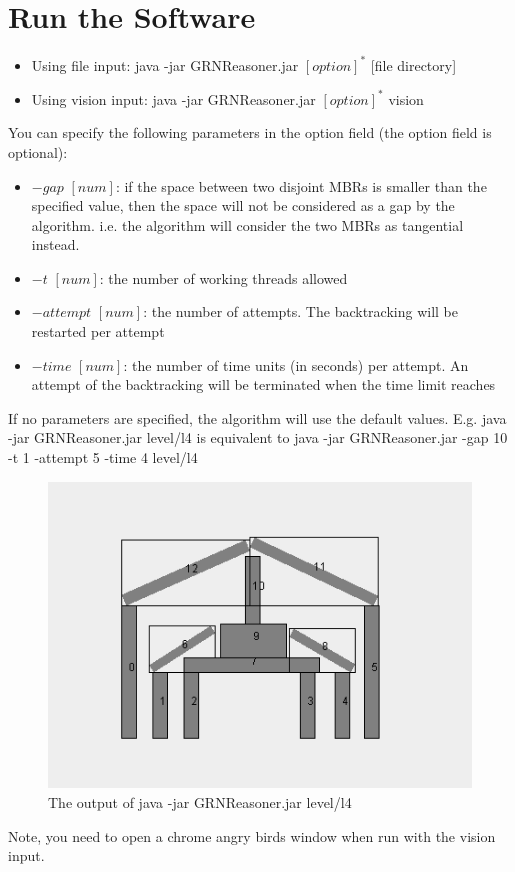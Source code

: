 \documentclass{article}
\begin{document}
\section{Run the Software}
\begin{itemize}
\item Using file input: java -jar GRNReasoner.jar $[option]^*$ [file directory]
\item Using vision input: java -jar GRNReasoner.jar $[option]^*$ vision
\end{itemize}
You can specify the following parameters in the option field (the option field is optional):
\begin{itemize}
\item $-gap\,\,[num]$: if the space between two disjoint MBRs is smaller than the specified value, then the space will not be considered as a gap by the algorithm. i.e. the algorithm will consider the two MBRs as tangential instead.
\item $-t\,\,[num]$: the number of working threads allowed 
\item $-attempt\,\,[num]$: the number of attempts. The backtracking will be restarted per attempt
\item $-time\,\,[num]$: the number of time units (in seconds) per attempt. An attempt of the backtracking will be terminated when the time limit reaches
\end{itemize}
If no parameters are specified, the algorithm will use the default values. E.g. java -jar GRNReasoner.jar level/l4 is equivalent to java -jar GRNReasoner.jar -gap 10 -t 1 -attempt 5 -time 4 level/l4
\begin{figure}[h!]
\centering\includegraphics[scale=0.35]{l4vo.png}\caption{The output of java -jar GRNReasoner.jar level/l4 }
\label{example}
\end{figure}
Note, you need to open a chrome angry birds window when run with the vision input.
\end{document}
